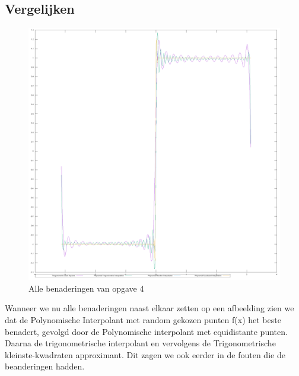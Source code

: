 \documentclass[10pt,a4paper]{article}
\begin{document}
\subsection{Vergelijken}
\begin{figure}[H]
\centering
\includegraphics[scale=0.3]{../Twographs/All}
\caption{Alle benaderingen van opgave 4}
\end{figure}
\begin{figure}[H]
\end{figure}
Wanneer we nu alle benaderingen naast elkaar zetten op een afbeelding zien we dat de Polynomische Interpolant met random gekozen punten f(x) het beste benadert, gevolgd door de Polynomische interpolant met equidistante punten. Daarna de trigonometrische interpolant en vervolgens de Trigonometrische kleinste-kwadraten approximant. Dit zagen we ook eerder in de fouten die de beanderingen hadden.
\end{document}
